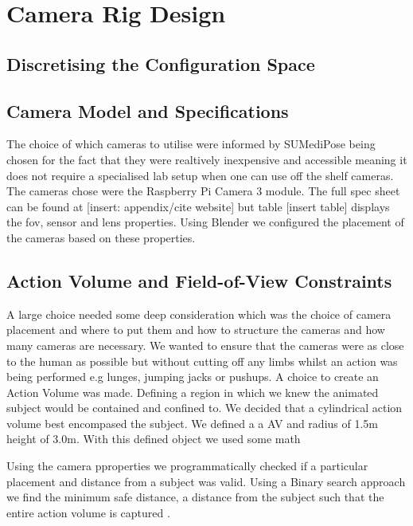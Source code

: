 \section{Camera Rig Design}
\label{sec:camerarig}

\subsection{Discretising the Configuration Space}
\cite{jorgensen2018simulation}

\subsection{Camera Model and Specifications}

The choice of which cameras to utilise were informed by SUMediPose being chosen for the fact that they were realtively inexpensive and accessible meaning it does not require a specialised lab setup when one can use off the shelf cameras. The cameras chose were the Raspberry Pi Camera 3 module. 
The full spec sheet can be found at [insert: appendix/cite website] but table [insert table] displays the fov, sensor and lens properties.
Using Blender we configured the placement of the cameras based on these properties.

\subsection{Action Volume and Field-of-View Constraints}

A large choice needed some deep consideration which was the choice of camera placement and where to put them and how to structure the cameras and how many cameras are necessary.
We wanted to ensure that the cameras were as close to the human as possible but without cutting off any limbs whilst an action was being performed e.g lunges, jumping jacks or pushups.
A choice to create an Action Volume was made. Defining a region in which we knew the animated subject would be contained and confined to.
We decided that a cylindrical action volume best encompased the subject. We defined a a AV and radius of 1.5m height of 3.0m. With this defined object we used some math

Using the camera pproperties we programmatically checked if a particular placement and distance from a subject was valid. Using a Binary search approach we find the minimum safe distance, a distance from the subject such that the entire action volume is captured . 

